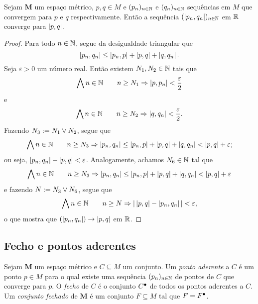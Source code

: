 \begin{proposition}
Sejam $\bm M$ um espaço métrico, $p,q \in M$ e $(p_n)_{n \in \mathbb{N}}$ e $(q_n)_{n \in \mathbb{N}}$ sequências em $M$ que convergem para $p$ e $q$ respectivamente. Então a sequência $(\left\vert{p_n},{q_n}\right\vert)_{n \in \mathbb{N}}$ em $\mathbb{R}$ converge para $\left\vert{p},{q}\right\vert$.
\end{proposition}
\begin{proof}
	Para todo $n \in \mathbb{N}$, segue da desigualdade triangular que
	\begin{equation*}
	\left\vert{p_n},{q_n}\right\vert \leq \left\vert{p_n},{p}\right\vert + \left\vert{p},{q}\right\vert + \left\vert{q},{q_n}\right\vert.
	\end{equation*}
Seja $\varepsilon > 0$ um número real. Então existem $N_1,N_2 \in \mathbb{N}$ tais que
	\begin{equation*}
	\bigwedge\nolimits n \in \mathbb{N} \qquad n \geq N_1 \Rightarrow \left\vert{p},{p_n}\right\vert < \frac{\varepsilon}{2}
	\end{equation*}
e
	\begin{equation*}
	\bigwedge\nolimits n \in \mathbb{N} \qquad n \geq N_2 \Rightarrow \left\vert{q},{q_n}\right\vert < \frac{\varepsilon}{2}.
	\end{equation*}
Fazendo $N_3 := N_1 \mathbin{\vee} N_2$, segue que
	\begin{equation*}
	\bigwedge\nolimits n \in \mathbb{N} \qquad n \geq N_3 \Rightarrow \left\vert{p_n},{q_n}\right\vert \leq \left\vert{p_n},{p}\right\vert + \left\vert{p},{q}\right\vert + \left\vert{q},{q_n}\right\vert < \left\vert{p},{q}\right\vert + \varepsilon;
	\end{equation*}
ou seja, $\left\vert{p_n},{q_n}\right\vert - \left\vert{p},{q}\right\vert < \varepsilon$. Analogamente, achamos $N_6 \in \mathbb{N}$ tal que
	\begin{equation*}
	\bigwedge\nolimits n \in \mathbb{N} \qquad n \geq N_3 \Rightarrow \left\vert{p_n},{q_n}\right\vert \leq \left\vert{p_n},{p}\right\vert + \left\vert{p},{q}\right\vert + \left\vert{q},{q_n}\right\vert < \left\vert{p},{q}\right\vert + \varepsilon
	\end{equation*}
e fazendo $N := N_3 \mathbin{\vee} N_6$, segue que
	\begin{equation*}
	\bigwedge\nolimits n \in \mathbb{N} \qquad n \geq N \Rightarrow |\left\vert{p},{q}\right\vert - \left\vert{p_n},{q_n}\right\vert| < \varepsilon,
	\end{equation*}
o que mostra que $(\left\vert{p_n},{q_n}\right\vert) \rightarrow \left\vert{p},{q}\right\vert$ em $\mathbb{R}$.
	
\end{proof}

\subsection{Fecho e pontos aderentes}

\begin{definition}
Sejam $\bm M$ um espaço métrico e $C \subseteq M$ um conjunto. Um \emph{ponto aderente} a $C$ é um ponto $p \in M$ para o qual existe uma sequência $(p_n)_{n \in \mathbb{N}}$ de pontos de $C$ que converge para $p$. O \emph{fecho} de $C$ é o conjunto ${C}^\bullet$ de todos os pontos aderentes a $C$. Um \emph{conjunto fechado} de $\bm M$ é um conjunto $F \subseteq M$ tal que $F = {F}^\bullet$.
\end{definition}

